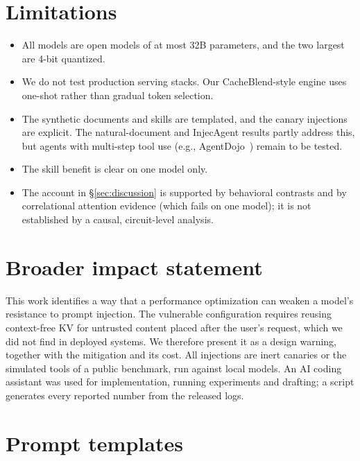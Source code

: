 \documentclass[10pt]{article}
\begin{document}
\section{Limitations}\label{sec:limitations}
\begin{itemize}
\item All models are open models of at most 32B parameters, and the two largest are 4-bit quantized.
\item We do not test production serving stacks. Our CacheBlend-style engine uses one-shot rather than gradual token selection.
\item The synthetic documents and skills are templated, and the canary injections are explicit. The natural-document and InjecAgent
  results partly address this, but agents with multi-step tool use (e.g., AgentDojo~\citep{debenedetti2024agentdojo}) remain to be
  tested.
\item The skill benefit is clear on one model only.
\item The account in \S\ref{sec:discussion} is supported by behavioral contrasts and by correlational attention evidence (which
  fails on one model); it is not established by a causal, circuit-level analysis.
\end{itemize}

\section*{Broader impact statement}
This work identifies a way that a performance optimization can weaken a model's resistance to prompt injection. The vulnerable
configuration requires reusing context-free KV for untrusted content placed after the user's request, which we did not find in
deployed systems. We therefore present it as a design warning, together with the mitigation and its cost. All injections are inert
canaries or the simulated tools of a public benchmark, run against local models. An AI coding assistant was used for
implementation, running experiments and drafting; a script generates every reported number from the released logs.




\appendix
\section{Prompt templates}\label{app:prompts}

\end{document}
